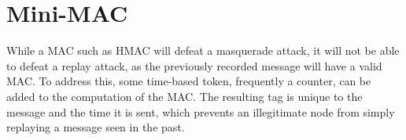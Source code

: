 \section{Mini-MAC}




	



While a MAC such as HMAC will defeat a masquerade attack, it will not be able to defeat a replay attack, as the previously recorded message will have a valid MAC. To address this, some time-based token, frequently a counter, can be added to the computation of the MAC. The resulting tag is unique to the message and the time it is sent, which prevents an illegitimate node from simply replaying a message seen in the past.

